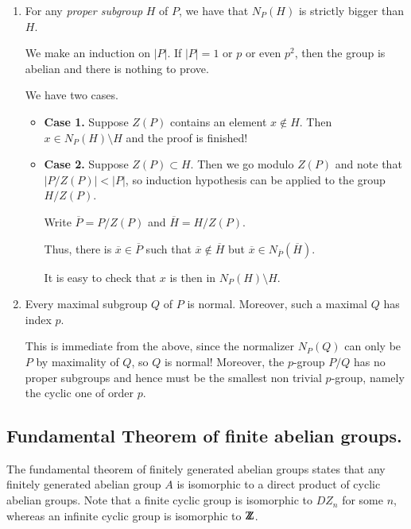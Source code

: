 \documentclass[12pt]{article}
\def\DZ{ \mbox{\rm Z \kern -0.75em Z} }
\begin{document}
\begin{enumerate}
\item For any {\it proper subgroup}  $H$ of $P$, we have that
$N_P(H)$ is strictly bigger than $H$.

We make an induction on $|P|$. If $|P|=1$ or $p$ or even $p^2$, then the
group is abelian and there is nothing to prove.

We have two cases.
\begin{itemize}
\item {\bf Case 1.} Suppose $Z(P)$ contains an element $x \not\in H$.
Then $x\in N_P(H)\setminus H$ and the proof is finished!

\item {\bf Case 2.} Suppose $Z(P)\subset H$. Then we go modulo $Z(P)$
and note that $|P/Z(P)|<|P|$, so induction hypothesis can be applied to
the group $H/Z(P)$.

Write $\overline{P}=P/Z(P)$ and $\overline{H}=H/Z(P)$.

Thus, there is $\overline{x} \in \overline{P}$ such that
$\overline{x}\not\in \overline{H}$ but
$\overline{x}\in N_{\overline{P}}(\overline{H})$.

It is easy to check that $x$ is then in $N_P(H)\setminus H$.

\end{itemize}

\item Every maximal subgroup $Q$ of $P$ is normal. Moreover, such a maximal
$Q$ has index $p$.

This is immediate from the above, since the normalizer $N_P(Q)$ can only
be $P$ by maximality of $Q$, so $Q$ is normal! Moreover, the $p$-group
$P/Q$ has no proper subgroups and hence must be the smallest non trivial
$p$-group, namely the cyclic one of order $p$.



\end{enumerate}

\subsection{Fundamental Theorem of finite abelian groups.}

The fundamental theorem of finitely generated
abelian groups states that any finitely
generated abelian group $A$ is isomorphic to a direct product of cyclic
abelian groups. Note that a finite cyclic group is isomorphic to $DZ_n$
for some $n$, whereas an infinite cyclic group is isomorphic to $\DZ$.
\end{document}
